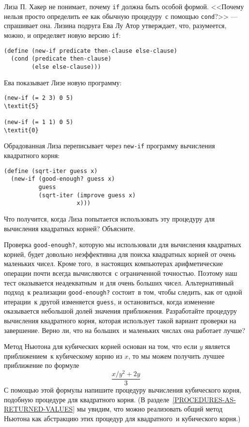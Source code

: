 \begin{exercise}{1.6}\label{EX1.6}%
Лиза П. Хакер не понимает, почему {\tt if}
должна быть особой формой.  <<Почему нельзя просто определить
ее как обычную процедуру~с помощью {\tt cond}?>> --- спрашивает 
она.  Лизина подруга Ева Лу Атор утверждает, что, разумеется, можно,
и определяет новую версию {\tt if}:

\begin{Verbatim}[fontsize=\small]
(define (new-if predicate then-clause else-clause)
  (cond (predicate then-clause)
        (else else-clause)))
\end{Verbatim}
Ева показывает Лизе новую программу:

\begin{Verbatim}[fontsize=\small]
(new-if (= 2 3) 0 5)
\textit{5}

(new-if (= 1 1) 0 5)
\textit{0}
\end{Verbatim}
Обрадованная Лиза переписывает через {\tt new-if}
программу вычисления квадратного корня:
\begin{Verbatim}[fontsize=\small]
(define (sqrt-iter guess x)
  (new-if (good-enough? guess x)
          guess
          (sqrt-iter (improve guess x)
                     x)))
\end{Verbatim}
Что получится, когда Лиза попытается использовать эту процедуру для
вычисления квадратных корней?  Объясните.
\end{exercise}

\begin{exercise}{1.7}\label{EX1.7}%
Проверка {\tt good-enough?}, которую мы
использовали для вычисления квадратных корней, будет довольно
неэффективна для поиска квадратных корней от очень маленьких чисел.
Кроме того,~в настоящих компьютерах арифметические операции почти
всегда вычисляются~с ограниченной точностью.  Поэтому наш тест
оказывается неадекватным~и для очень больших чисел.  Альтернативный
подход~к реализации {\tt good-enough?} состоит~в том, чтобы
следить, как от одной итерации~к другой изменяется {\tt guess}, 
и остановиться, когда изменение оказывается небольшой долей значения
приближения.  Разработайте процедуру вычисления квадратного корня,
которая использует такой вариант проверки на завершение.  Верно ли,
что на больших~и маленьких числах она работает лучше?
\end{exercise}
\begin{exercise}{1.8}\label{EX1.8}%
{}%
% 
%
Метод Ньютона для кубических корней основан на том, что 
если $y$ является приближением~к кубическому корню из
$x$, то мы можем получить лучшее приближение по формуле
\samepage%
$$
\dfrac{x/y^2  + 2y}{3}
$$
С помощью этой формулы напишите процедуру вычисления
кубического корня, подобную процедуре для квадратного корня. (В
разделе~\ref{PROCEDURES-AS-RETURNED-VALUES} мы увидим,
что можно реализовать общий метод Ньютона как абстракцию этих процедур для
квадратного~и кубического корня.)
\end{exercise}
